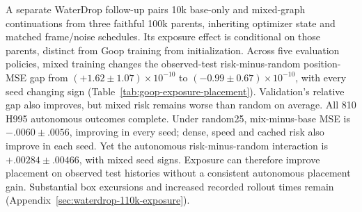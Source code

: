 A separate WaterDrop follow-up pairs 10k base-only and mixed-graph continuations from three faithful 100k parents, inheriting optimizer state and matched frame/noise schedules. Its exposure effect is conditional on those parents, distinct from Goop training from initialization. Across five evaluation policies, mixed training changes the observed-test risk-minus-random position-MSE gap from $(+1.62\pm1.07)\times10^{-10}$ to $(-0.99\pm0.67)\times10^{-10}$, with every seed changing sign (Table~\ref{tab:goop-exposure-placement}). Validation's relative gap also improves, but mixed risk remains worse than random on average. All 810 H995 autonomous outcomes complete. Under random25, mix-minus-base MSE is $-.0060\pm.0056$, improving in every seed; dense, speed and cached risk also improve in each seed. Yet the autonomous risk-minus-random interaction is $+.00284\pm.00466$, with mixed seed signs. Exposure can therefore improve placement on observed test histories without a consistent autonomous placement gain. Substantial box excursions and increased recorded rollout times remain (Appendix~\ref{sec:waterdrop-110k-exposure}).
